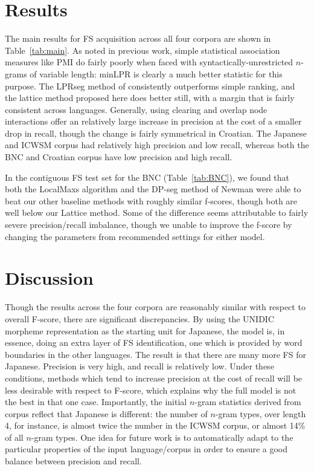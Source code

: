 \documentclass[11pt,letterpaper]{article}
\newcommand{\tabref}[2][]{Table#1~\ref{#2}\xspace}
\begin{document}
\section{Results}

The main results for FS acquisition across all four corpora are shown in \tabref{tab:main}. As noted in previous work, simple statistical association measures like PMI do fairly poorly when faced with syntactically-unrestricted $n$-grams of variable length: minLPR is clearly a much better statistic for this purpose. The LPRseg method of  consistently outperforms simple ranking, and the lattice method proposed here does better still, with a margin that is fairly consistent across languages. Generally, using clearing and overlap node interactions offer an relatively large increase in precision at the cost of a smaller drop in recall, though the change is fairly symmetrical in Croatian. The Japanese and ICWSM corpus had relatively high precision and low recall, whereas both the BNC and Croatian corpus have low precision and high recall.

In the contiguous FS test set for the BNC (\tabref{tab:BNC}), we found that both the LocalMaxs algorithm and the DP-seg method of Newman \cite{Newman12} were able to beat our other baseline methods with roughly similar f-scores, though both are well below our Lattice method. Some of the difference seems attributable to fairly severe precision/recall imbalance, though we unable to improve the f-score by changing the parameters from recommended settings for either model.


\section{Discussion} \label{sec:discussion}

Though the results across the four corpora are reasonably similar with respect to overall F-score, there are significant discrepancies. By using the UNIDIC morpheme representation as the starting unit for Japanese, the model is, in essence, doing an extra layer of FS identification, one which is provided by word boundaries in the other languages. The result is that there are many more FS for Japanese. Precision is very high, and recall is relatively low. Under these conditions, methods which tend to increase precision at the cost of recall will be less desirable with respect to F-score, which explains why the full model is not the best in that one case.  Importantly, the initial $n$-gram statistics derived from corpus reflect that Japanese is different: the number of $n$-gram types, over length 4, for instance, is almost twice the number in the ICWSM corpus, or almost 14\% of all $n$-gram types. One idea for future work is to automatically adapt to the particular properties of the input language/corpus in order to ensure a good balance between precision and recall.
\end{document}

